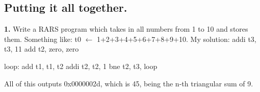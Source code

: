 \documentclass{article}
\begin{document}
    \subsection{Putting it all together.}
    \par \textbf{1.} Write a RARS program which takes in all numbers from 1 to 10 and stores them.
    Something like:  t0 $\leftarrow$ 1+2+3+4+5+6+7+8+9+10. \smallbreak
    My solution: \smallbreak
    addi t3, t3, 11\smallbreak
    add t2, zero, zero\smallbreak

    loop:\smallbreak
        \qquad add t1, t1, t2\smallbreak
        \qquad addi t2, t2, 1\smallbreak
        \qquad bne  t2, t3, loop\smallbreak
    \par All of this outputs 0x0000002d, which is 45, being the n-th triangular
    sum of 9.
\end{document}
